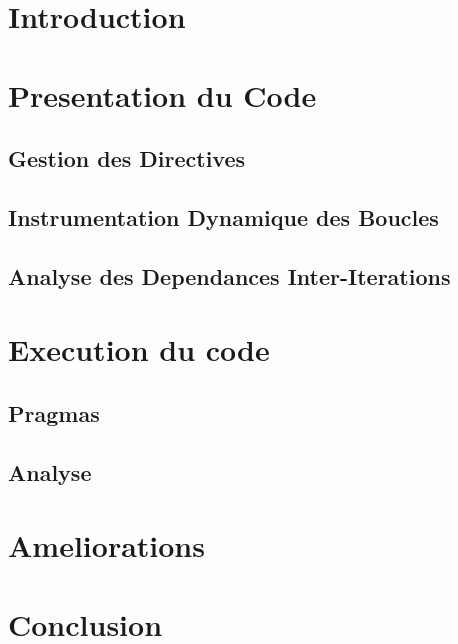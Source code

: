 \documentclass[12pt]{article}
\begin{document}
\section{Introduction}



\section{Presentation du Code}

\subsection{Gestion des Directives}

\subsection{Instrumentation Dynamique des Boucles}

\subsection{Analyse des Dependances Inter-Iterations}



\section{Execution du code}

\subsection{Pragmas}
\subsection{Analyse}




\section{Ameliorations}





\section{Conclusion}
\end{document}
